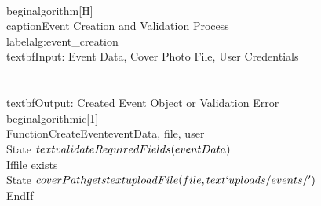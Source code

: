 \\begin{algorithm}[H]
\\caption{Event Creation and Validation Process}
\\label{alg:event_creation}
\\textbf{Input:} Event Data, Cover Photo File, User Credentials\\\\
\\textbf{Output:} Created Event Object or Validation Error
\\begin{algorithmic}[1]
\\Function{CreateEvent}{eventData, file, user}
    \\State $\\text{validateRequiredFields}(eventData)$
    \\If{file exists}
        \\State $coverPath \\gets \\text{uploadFile}(file, \\text{`uploads/events/'})$
    \\EndIf
